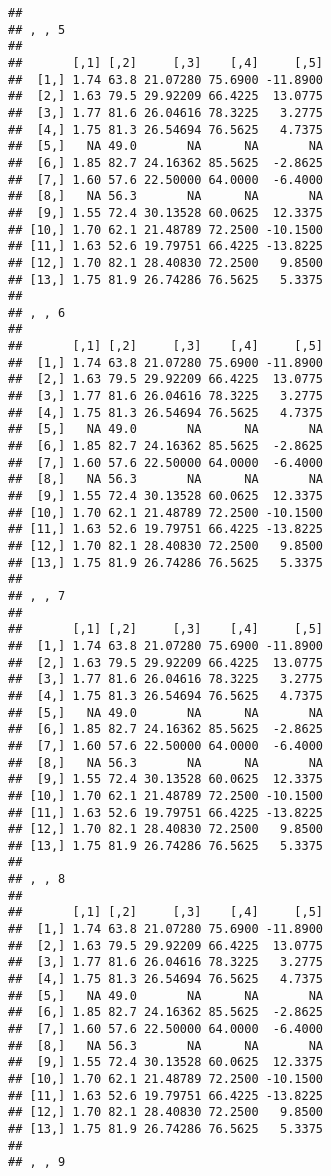 \documentclass[]{article}
\begin{document}
\begin{verbatim}
## 
## , , 5
## 
##       [,1] [,2]     [,3]    [,4]     [,5]
##  [1,] 1.74 63.8 21.07280 75.6900 -11.8900
##  [2,] 1.63 79.5 29.92209 66.4225  13.0775
##  [3,] 1.77 81.6 26.04616 78.3225   3.2775
##  [4,] 1.75 81.3 26.54694 76.5625   4.7375
##  [5,]   NA 49.0       NA      NA       NA
##  [6,] 1.85 82.7 24.16362 85.5625  -2.8625
##  [7,] 1.60 57.6 22.50000 64.0000  -6.4000
##  [8,]   NA 56.3       NA      NA       NA
##  [9,] 1.55 72.4 30.13528 60.0625  12.3375
## [10,] 1.70 62.1 21.48789 72.2500 -10.1500
## [11,] 1.63 52.6 19.79751 66.4225 -13.8225
## [12,] 1.70 82.1 28.40830 72.2500   9.8500
## [13,] 1.75 81.9 26.74286 76.5625   5.3375
## 
## , , 6
## 
##       [,1] [,2]     [,3]    [,4]     [,5]
##  [1,] 1.74 63.8 21.07280 75.6900 -11.8900
##  [2,] 1.63 79.5 29.92209 66.4225  13.0775
##  [3,] 1.77 81.6 26.04616 78.3225   3.2775
##  [4,] 1.75 81.3 26.54694 76.5625   4.7375
##  [5,]   NA 49.0       NA      NA       NA
##  [6,] 1.85 82.7 24.16362 85.5625  -2.8625
##  [7,] 1.60 57.6 22.50000 64.0000  -6.4000
##  [8,]   NA 56.3       NA      NA       NA
##  [9,] 1.55 72.4 30.13528 60.0625  12.3375
## [10,] 1.70 62.1 21.48789 72.2500 -10.1500
## [11,] 1.63 52.6 19.79751 66.4225 -13.8225
## [12,] 1.70 82.1 28.40830 72.2500   9.8500
## [13,] 1.75 81.9 26.74286 76.5625   5.3375
## 
## , , 7
## 
##       [,1] [,2]     [,3]    [,4]     [,5]
##  [1,] 1.74 63.8 21.07280 75.6900 -11.8900
##  [2,] 1.63 79.5 29.92209 66.4225  13.0775
##  [3,] 1.77 81.6 26.04616 78.3225   3.2775
##  [4,] 1.75 81.3 26.54694 76.5625   4.7375
##  [5,]   NA 49.0       NA      NA       NA
##  [6,] 1.85 82.7 24.16362 85.5625  -2.8625
##  [7,] 1.60 57.6 22.50000 64.0000  -6.4000
##  [8,]   NA 56.3       NA      NA       NA
##  [9,] 1.55 72.4 30.13528 60.0625  12.3375
## [10,] 1.70 62.1 21.48789 72.2500 -10.1500
## [11,] 1.63 52.6 19.79751 66.4225 -13.8225
## [12,] 1.70 82.1 28.40830 72.2500   9.8500
## [13,] 1.75 81.9 26.74286 76.5625   5.3375
## 
## , , 8
## 
##       [,1] [,2]     [,3]    [,4]     [,5]
##  [1,] 1.74 63.8 21.07280 75.6900 -11.8900
##  [2,] 1.63 79.5 29.92209 66.4225  13.0775
##  [3,] 1.77 81.6 26.04616 78.3225   3.2775
##  [4,] 1.75 81.3 26.54694 76.5625   4.7375
##  [5,]   NA 49.0       NA      NA       NA
##  [6,] 1.85 82.7 24.16362 85.5625  -2.8625
##  [7,] 1.60 57.6 22.50000 64.0000  -6.4000
##  [8,]   NA 56.3       NA      NA       NA
##  [9,] 1.55 72.4 30.13528 60.0625  12.3375
## [10,] 1.70 62.1 21.48789 72.2500 -10.1500
## [11,] 1.63 52.6 19.79751 66.4225 -13.8225
## [12,] 1.70 82.1 28.40830 72.2500   9.8500
## [13,] 1.75 81.9 26.74286 76.5625   5.3375
## 
## , , 9

\end{verbatim}
\end{document}
